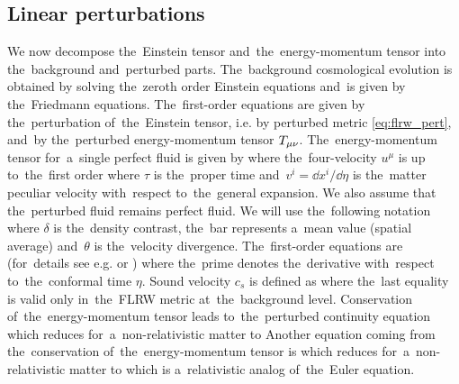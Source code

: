 \subsection{Linear perturbations}
We now decompose the~Einstein tensor and~the~energy-momentum tensor into the~background and~perturbed parts. The~background cosmological evolution is obtained by solving the~zeroth order Einstein equations and~is given by the~Friedmann equations. The~first-order equations are given by the~perturbation of~the~Einstein tensor, i.e. by perturbed metric \eqref{eq:flrw_pert}, and~by the~perturbed energy-momentum tensor $T_{\mu\nu}$. The~energy-momentum tensor for~a~single perfect fluid is given by
where the~four-velocity $u^\mu$ is up to~the~first order
where $\tau$ is the~proper time and~$v^i=\dd x^i/\dd\eta$ is the~matter peculiar velocity with~respect to~the~general expansion. We also assume that the~perturbed fluid remains perfect fluid. We will use the~following notation
where $\delta$ is the~density contrast, the~bar represents a~mean value (spatial average) and~$\theta$ is the~velocity divergence. The~first-order equations are (for~details see e.g. \cite{2002col.luc..cosmology} or \cite{10.1143/PTPS.78.1})
where the~prime denotes the~derivative with~respect to~the~conformal time $\eta$. Sound velocity $c_s$ is defined as
where the~last equality is valid only in~the~FLRW metric at~the~background level. Conservation of~the~energy-momentum tensor leads to~the~perturbed continuity equation
which reduces for~a~non-relativistic matter to
Another equation coming from the~conservation of~the~energy-momentum tensor is
which reduces for~a~non-relativistic matter to
which is a~relativistic analog of~the~Euler equation.


